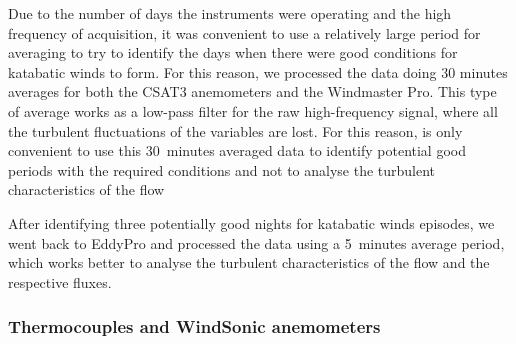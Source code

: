 Due to the number of days the instruments were operating and the high frequency of acquisition, it was convenient to use a relatively large period for averaging to try to identify the days when there were good conditions for katabatic winds to form. For this reason, we processed the data doing 30 minutes averages for both the CSAT3 anemometers and the Windmaster Pro. This type of average works as a low-pass filter for the raw high-frequency signal, where all the turbulent fluctuations of the variables are lost. For this reason, is only convenient to use this 30~minutes averaged data to identify potential good periods with the required conditions and not to analyse the turbulent characteristics of the flow

After identifying three potentially good nights for katabatic winds episodes, we went back to EddyPro and processed the data using a 5~minutes average period, which works better to analyse the turbulent characteristics of the flow and the respective fluxes. 

\subsubsection{Thermocouples and WindSonic anemometers}





